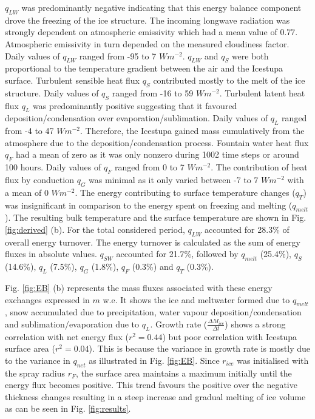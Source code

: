 \documentclass[utf8]{frontiersSCNS} %
\begin{document}
$q_{LW}$ was predominantly negative indicating that this energy balance component drove the freezing of the ice
structure. The incoming longwave radiation was strongly dependent on atmospheric emissivity which had a mean value of
0.77. Atmospheric emissivity in turn depended on the measured cloudiness factor. Daily values of $q_{LW}$ ranged from
-95 to 7 $Wm^{-2}$.  $q_{LW}$ and $q_{S}$ were both proportional to the temperature gradient between the air and the
Icestupa surface. Turbulent sensible heat flux $q_{S}$ contributed mostly to the melt of the ice structure. Daily values
of $q_{S}$ ranged from -16 to 59 $Wm^{-2}$. Turbulent latent heat flux $q_{L}$ was predominantly positive suggesting
that it favoured deposition/condensation over evaporation/sublimation. Daily values of $q_{L}$ ranged from -4 to 47
$Wm^{-2}$. Therefore, the Icestupa gained mass cumulatively from the atmosphere due to the deposition/condensation
process. Fountain water heat flux $q_{F}$ had a mean of zero as it was only nonzero during 1002 time steps or around 100
hours. Daily values of $q_{F}$ ranged from 0 to 7 $Wm^{-2}$. The contribution of heat flux by conduction $q_{G}$ was
minimal as it only varied between -7 to 7 $Wm^{-2}$ with a mean of 0 $Wm^{-2}$. The energy contributing to surface
temperature changes ($q_{T}$) was insignificant in comparison to the energy spent on freezing and melting ($q_{melt}$).
The resulting bulk temperature and the surface temperature are shown in Fig. \ref{fig:derived} (b).  For the total
considered period, $q_{LW}$ accounted for 28.3\% of overall energy turnover. The energy turnover is calculated as the
sum of energy fluxes in absolute values. $q_{SW}$ accounted for 21.7\%, followed by $q_{melt}$ (25.4\%), $q_{S}$
(14.6\%), $q_{L}$ (7.5\%), $q_{G}$ (1.8\%), $q_{F}$ (0.3\%) and $q_{T}$ (0.3\%).

Fig. \ref{fig:EB} (b) represents the mass fluxes associated with these energy exchanges expressed in $m$ w.e. It shows
the ice and meltwater formed due to $q_{melt}$, snow accumulated due to precipitation, water vapour
deposition/condensation and sublimation/evaporation due to $q_L$. Growth rate ($\frac{\Delta M_{ice}}{\Delta t}$) shows
a strong correlation with net energy flux ($r^2 = 0.44$) but poor correlation with Icestupa surface area ($r^2 = 0.04$).
This is because the variance in growth rate is mostly due to the variance in $q_{net}$ as illustrated in Fig.
\ref{fig:EB}. Since $r_{ice}$ was initialised with the spray radius $r_F$, the surface area maintains a maximum
initially until the energy flux becomes positive. This trend favours the positive over the negative thickness changes
resulting in a steep increase and gradual melting of ice volume as can be seen in Fig. \ref{fig:results}.
\end{document}
